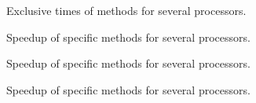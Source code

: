 \documentclass{article}
\begin{document}
	\begin{figure}
		\hspace{-2cm}
		\rule{0cm}{1.1cm}
		\caption{Exclusive times of methods for several processors.}
	\end{figure}
	\begin{figure}
		\hspace{-2cm}
		\rule{0cm}{1.1cm}
		\caption{Speedup of specific methods for several processors.}
	\end{figure}
		\begin{figure}
		\hspace{-2cm}
		\rule{0cm}{1.1cm}
		\caption{Speedup of specific methods for several processors.}
		\end{figure}
		\begin{figure}
			\hspace{-2cm}
			\rule{0cm}{1.1cm}
			\caption{Speedup of specific methods for several processors.}
		\end{figure}
\end{document}
